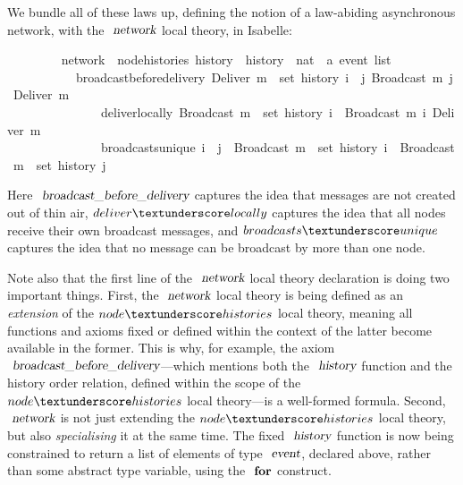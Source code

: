 \documentclass[acmlarge,review,anonymous]{acmart}\settopmatter{printfolios=true}
\begin{document}
We bundle all of these laws up, defining the notion of a law-abiding asynchronous network, with the $\isa{network}$ local theory, in Isabelle:
\\
\begin{isabellebody}
\ \ \ \ \ \ \ \  network\ {\isacharequal}\ node{\isacharunderscore}histories\ history\ \ history\ {\isacharcolon}{\isacharcolon}\ {\isachardoublequoteopen}nat\ {\isasymRightarrow}\ {\isacharprime}a\ event\ list{\isachardoublequoteclose}\ {\isacharplus}\isanewline
\ \ \ \ \ \ \ \ \ \ \ broadcast{\isacharunderscore}before{\isacharunderscore}delivery{\isacharcolon}\ {\isachardoublequoteopen}Deliver\ m\ {\isasymin}\ set\ {\isacharparenleft}history\ i{\isacharparenright}\ {\isasymLongrightarrow}\ {\isasymexists}j{\isachardot}\ Broadcast\ m\ {\isasymsqsubset}\isactrlsup j\ Deliver\ m{\isachardoublequoteclose}\isanewline
\ \ \ \ \ \ \ \ \ \ \ \ \ \ \ deliver{\isacharunderscore}locally{\isacharcolon}\ {\isachardoublequoteopen}Broadcast\ m\ {\isasymin}\ set\ {\isacharparenleft}history\ i{\isacharparenright}\ {\isasymLongrightarrow}\ Broadcast\ m\ {\isasymsqsubset}\isactrlsup i\ Deliver\ m{\isachardoublequoteclose}\isanewline
\ \ \ \ \ \ \ \ \ \ \ \ \ \ \ broadcasts{\isacharunderscore}unique{\isacharcolon}\ {\isachardoublequoteopen}i\ {\isasymnoteq}\ j\ {\isasymLongrightarrow}\ Broadcast\ m\ {\isasymin}\ set\ {\isacharparenleft}history\ i{\isacharparenright}\ {\isasymLongrightarrow}\ Broadcast\ m\ {\isasymnotin}\ set\ {\isacharparenleft}history\ j{\isacharparenright}{\isachardoublequoteclose}
\end{isabellebody}
\vspace{\baselineskip}
Here $\isa{broadcast{\isacharunderscore}before{\isacharunderscore}delivery}$ captures the idea that messages are not created out of thin air, $deliver{\isacharunderscore}locally$ captures the idea that all nodes receive their own broadcast messages, and $broadcasts{\isacharunderscore}unique$ captures the idea that no message can be broadcast by more than one node.

Note also that the first line of the $\isa{network}$ local theory declaration is doing two important things.
First, the $\isa{network}$ local theory is being defined as an \emph{extension} of the $node{\isacharunderscore}histories$ local theory, meaning all functions and axioms fixed or defined within the context of the latter become available in the former.
This is why, for example, the axiom $\isa{broadcast{\isacharunderscore}before{\isacharunderscore}delivery}$---which mentions both the $\isa{history}$ function and the history order relation, defined within the scope of the $node{\isacharunderscore}histories$ local theory---is a well-formed formula.
Second, $\isa{network}$ is not just extending the $node{\isacharunderscore}histories$ local theory, but also \emph{specialising} it at the same time.
The fixed $\isa{history}$ function is now being constrained to return a list of elements of type $\isa{event}$, declared above, rather than some abstract type variable, using the $\isacommand{for}$ construct.
\end{document}
